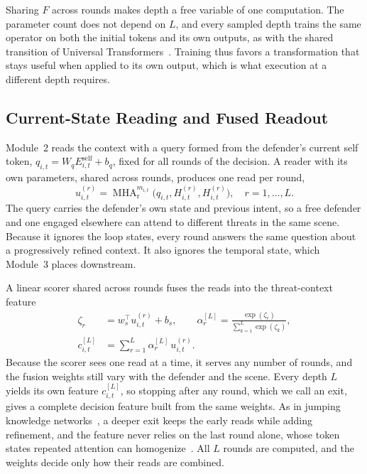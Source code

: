 Sharing $F$ across rounds makes depth a free variable of one computation. The parameter count does not depend on $L$, and every sampled depth trains the same operator on both the initial tokens and its own outputs, as with the shared transition of Universal Transformers~\cite{dehghani2019universal}. Training thus favors a transformation that stays useful when applied to its own output, which is what execution at a different depth requires.

\subsection{Current-State Reading and Fused Readout}
\label{subsec:method-read}
Module~2 reads the context with a query formed from the defender's current self token, $q_{i,t}=W_qE^{\mathrm{self}}_{i,t}+b_q$, fixed for all rounds of the decision. A reader with its own parameters, shared across rounds, produces one read per round,
\begin{equation}
u^{(r)}_{i,t}=\operatorname{MHA}^{m_{i,t}}_{\mathrm r}\big(q_{i,t},H^{(r)}_{i,t},H^{(r)}_{i,t}\big),\quad r=1,\dots,L.
\label{eq:read}
\end{equation}
The query carries the defender's own state and previous intent, so a free defender and one engaged elsewhere can attend to different threats in the same scene. Because it ignores the loop states, every round answers the same question about a progressively refined context. It also ignores the temporal state, which Module~3 places downstream.

A linear scorer shared across rounds fuses the reads into the threat-context feature
\begin{align}
\zeta_r&=w_s^{\top}u^{(r)}_{i,t}+b_s,\qquad
\alpha^{[L]}_{r}=\frac{\exp(\zeta_r)}{\sum_{k=1}^{L}\exp(\zeta_k)},\nonumber\\
c^{[L]}_{i,t}&=\sum_{r=1}^{L}\alpha^{[L]}_{r}\,u^{(r)}_{i,t}.
\label{eq:fusion}
\end{align}
Because the scorer sees one read at a time, it serves any number of rounds, and the fusion weights still vary with the defender and the scene. Every depth $L$ yields its own feature $c^{[L]}_{i,t}$, so stopping after any round, which we call an exit, gives a complete decision feature built from the same weights. As in jumping knowledge networks~\cite{xu2018jk}, a deeper exit keeps the early reads while adding refinement, and the feature never relies on the last round alone, whose token states repeated attention can homogenize~\cite{dong2021attention}. All $L$ rounds are computed, and the weights decide only how their reads are combined.

